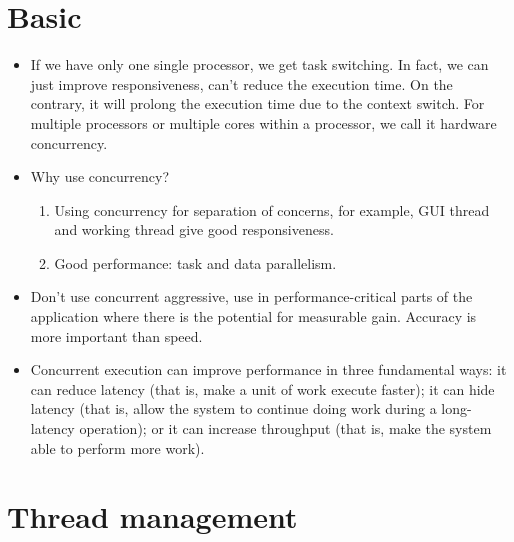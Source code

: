 \documentclass[a4paper,11pt,twoside]{book}
\begin{document}
\section{Basic}
\begin{itemize}
	\item If we have only one single processor, we get task switching. In fact, we can just improve responsiveness, can't reduce the execution time. On the contrary, it will prolong the execution time due to the context switch. For multiple processors or multiple cores within a processor, we call it hardware concurrency. 
	
	\item Why use concurrency? 
	\begin{enumerate}
		\item Using concurrency for separation of concerns, for example, GUI thread and working thread give good responsiveness.
		\item Good performance: task and data parallelism.
	\end{enumerate}

	\item Don't use concurrent aggressive, use in performance-critical parts of the application where there is the potential for measurable gain. Accuracy is more important than speed. 
	
	\item Concurrent execution can improve performance in three fundamental ways: it can reduce latency (that is, make a unit of work execute faster); it can hide latency (that is, allow the system to continue doing work during a long-latency operation); or it can increase throughput (that is, make the system able to perform more work). 
	
\end{itemize}

\section{Thread management}
\end{document}
